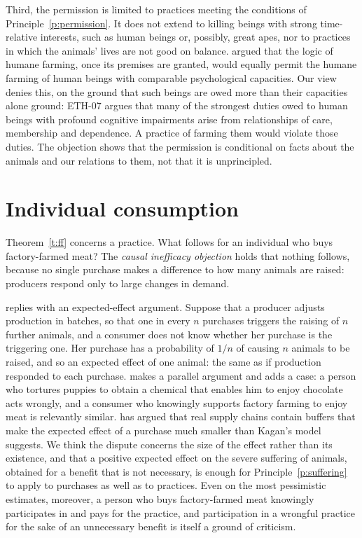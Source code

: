 \documentclass{situationist-preprint}
\begin{document}
Third, the permission is limited to practices meeting the conditions of Principle~\ref{p:permission}. It does not extend to killing beings with strong time-relative interests, such as human beings or, possibly, great apes, nor to practices in which the animals' lives are not good on balance. \citet{McMahan2008} argued that the logic of humane farming, once its premises are granted, would equally permit the humane farming of human beings with comparable psychological capacities. Our view denies this, on the ground that such beings are owed more than their capacities alone ground: ETH-07 argues that many of the strongest duties owed to human beings with profound cognitive impairments arise from relationships of care, membership and dependence. A practice of farming them would violate those duties. The objection shows that the permission is conditional on facts about the animals and our relations to them, not that it is unprincipled.

\section{Individual consumption}

Theorem~\ref{t:ff} concerns a practice. What follows for an individual who buys factory-farmed meat? The \emph{causal inefficacy objection} holds that nothing follows, because no single purchase makes a difference to how many animals are raised: producers respond only to large changes in demand.

\citet{Kagan2011} replies with an expected-effect argument. Suppose that a producer adjusts production in batches, so that one in every $n$ purchases triggers the raising of $n$ further animals, and a consumer does not know whether her purchase is the triggering one. Her purchase has a probability of $1/n$ of causing $n$ animals to be raised, and so an expected effect of one animal: the same as if production responded to each purchase. \citet{Norcross2004} makes a parallel argument and adds a case: a person who tortures puppies to obtain a chemical that enables him to enjoy chocolate acts wrongly, and a consumer who knowingly supports factory farming to enjoy meat is relevantly similar. \citet{Budolfson2019} has argued that real supply chains contain buffers that make the expected effect of a purchase much smaller than Kagan's model suggests. We think the dispute concerns the size of the effect rather than its existence, and that a positive expected effect on the severe suffering of animals, obtained for a benefit that is not necessary, is enough for Principle~\ref{p:suffering} to apply to purchases as well as to practices. Even on the most pessimistic estimates, moreover, a person who buys factory-farmed meat knowingly participates in and pays for the practice, and participation in a wrongful practice for the sake of an unnecessary benefit is itself a ground of criticism.
\end{document}
